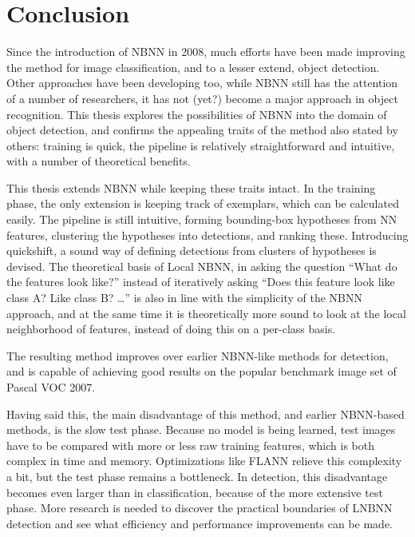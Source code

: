 
\chapter{Conclusion} %
\label{cha:conclusion}

Since the introduction of NBNN in 2008, much efforts have been made improving the method for image classification, and to a lesser extend, object detection. Other approaches have been developing too, while NBNN still has the attention of a number of researchers, it has not (yet?) become a major approach in object recognition. This thesis explores the possibilities of NBNN into the domain of object detection, and confirms the appealing traits of the method also stated by others: training is quick, the pipeline is relatively straightforward and intuitive, with a number of theoretical benefits.

This thesis extends NBNN while keeping these traits intact. In the training phase, the only extension is keeping track of exemplars, which can be calculated easily. The pipeline is still intuitive, forming bounding-box hypotheses from NN features, clustering the hypotheses into detections, and ranking these. Introducing quickshift, a sound way of defining detections from clusters of hypotheses is devised. The theoretical basis of Local NBNN, in asking the question ``What do the features look like?'' instead of iteratively asking ``Does this feature look like class A? Like class B? \ldots'' is also in line with the simplicity of the NBNN approach, and at the same time it is theoretically more sound to look at the local neighborhood of features, instead of doing this on a per-class basis.

The resulting method improves over earlier NBNN-like methods for detection, and is capable of achieving good results on the popular benchmark image set of Pascal VOC 2007.

Having said this, the main disadvantage of this method, and earlier NBNN-based methods, is the slow test phase. Because no model is being learned, test images have to be compared with more or less raw training features, which is both complex in time and memory. Optimizations like FLANN relieve this complexity a bit, but the test phase remains a bottleneck. In detection, this disadvantage becomes even larger than in classification, because of the more extensive test phase. More research is needed to discover the practical boundaries of LNBNN detection and see what efficiency and performance improvements can be made.\\


